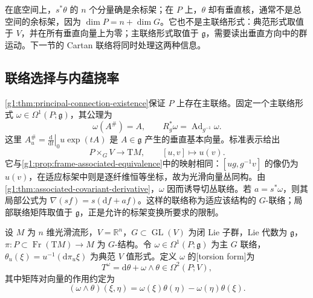 在底空间上，\(s^*\theta\) 的 \(n\) 个分量确是余标架；在 \(P\) 上，\(\theta\) 却有垂直核，通常不是总空间的余标架，因为 \(\dim P=n+\dim G\)。它也不是主联络形式：典范形式取值于 \(V\)，并在所有垂直向量上为零；主联络形式取值于 \(\mathfrak g\)，需要读出垂直方向中的群运动。下一节的 Cartan 联络将同时处理这两种信息。

\subsection{联络选择与内蕴挠率}
\label{g1:subsec:D01:02}

\cref{g1:thm:principal-connection-existence}保证 \(P\) 上存在主联络。固定一个主联络形式 \(\omega\in\Omega^1(P;\mathfrak g)\)，其公理为
\[
	\omega(A^\#)=A,\qquad R_g^*\omega=\operatorname{Ad}_{g^{-1}}\omega.
\]
这里 \(A^\#_u=\left.\frac{\mathrm{d}}{\mathrm{d}t}\right|_{0}u\exp(tA)\) 是 \(A\in\mathfrak g\) 产生的垂直基本向量。标准表示给出
\[
	P\times_G V\longrightarrow\mathrm{T}M,\qquad [u,v]\longmapsto u(v).
\]
它与\cref{g1:prop:frame-associated-equivalence}中的映射相同：\([ug,g^{-1}v]\) 的像仍为 \(u(v)\)，在适应标架中则是逐纤维恒等坐标，故为光滑向量丛同构。由\cref{g1:thm:associated-covariant-derivative}，\(\omega\) 因而诱导切丛联络。若 \(a=s^*\omega\)，则其局部公式为 \(\nabla(s f)=s(\mathrm{d}f+a f)\)。这样的联络称为适应该结构的 \(G\)-联络；局部联络矩阵取值于 \(\mathfrak g\)，正是允许的标架变换所要求的限制。

\begin{definition}
	\label{g1:def:g-structure-torsion-form}
	设 \(M\) 为 \(n\) 维光滑流形，\(V=\mathbb R^n\)，\(G\subset\operatorname{GL}(V)\) 为闭 Lie 子群，Lie 代数为 \(\mathfrak g\)，\(\pi:P\subset\operatorname{Fr}(\mathrm TM)\to M\) 为 \(G\)-结构。令 \(\omega\in\Omega^1(P;\mathfrak g)\) 为主 \(G\) 联络，\(\theta_u(\xi)=u^{-1}(\mathrm d\pi_u\xi)\) 为典范 \(V\) 值形式。定义 \(\omega\) 的[torsion form]为
	\begin{equation}
		\label{g1:eq:g-structure-torsion-form}
		T^\omega=\mathrm{d}\theta+\omega\wedge\theta\in\Omega^2(P;V),
	\end{equation}
	其中矩阵对向量的作用约定为
	\[
		(\omega\wedge\theta)(\xi,\eta)
		=\omega(\xi)\theta(\eta)-\omega(\eta)\theta(\xi).
	\]
\end{definition}

